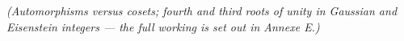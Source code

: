 \textit{(Automorphisms versus cosets; fourth and third roots of unity in Gaussian and Eisenstein integers --- the full working is set out in Annexe E.)}

% 
% 
% 
% 
% 
% 
